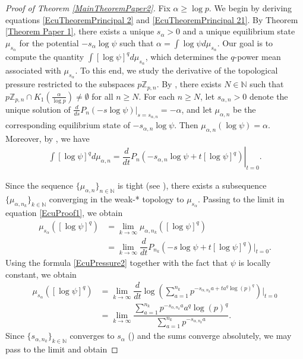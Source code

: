 \documentclass[11pt]{amsart}
\theoremstyle{remark}
\numberwithin{equation}{section}
\newcommand{\N}{\mathbb{N}}
\newcommand{\Z}{\mathbb{Z}}
\begin{document}
\begin{proof}[Proof of Theorem \ref{MainTheoremPaper2}]
    Fix $\alpha\geq \log p$. We begin by deriving equations \eqref{EcuTheoremPrincipal 2} and \eqref{EcuTheoremPrincipal 21}. By Theorem \ref{Theorem Paper 1}, there exists a unique $s_{\alpha}>0$ and a unique equilibrium state $\mu_{s_{\alpha}}$ for the potential $-s_{\alpha}\log\psi$ such that $\alpha=\int \log\psi d\mu_{s_{\alpha}}$. Our goal is to compute the quantity $\int [\log\psi]^{q}d\mu_{s_{\alpha}}$, which determines the $q$-power mean associated with $\mu_{s_{\alpha}}$. To this end, we study the derivative of the topological pressure restricted to the subspaces $p\Z_{p,n}$. By \cite[Theorem 3.3]{paper1}, there exists $N\in \N$ such that $p\Z_{p,n}\cap K_{1}(\frac{\alpha}{\log p})\neq \emptyset$ for all $n\geq N$. For each $n\geq N$, let $s_{\alpha,n}>0$ denote the unique solution of $\frac{d}{ds}P_{n}(-s\log\psi)\big\lvert_{s=s_{\alpha,n}}=-\alpha$, and let $\mu_{\alpha,n}$ be the corresponding equilibrium state of $-s_{\alpha,n}\log \psi$. Then $\mu_{\alpha,n}(\log\psi)=\alpha$. Moreover, by \cite[Theorem 5.6.5]{pu}, we have
    \begin{align}\label{EcuProof1}
        \int[\log\psi]^{q}d\mu_{\alpha,n}=\left.\dfrac{d}{dt}P_{n}(-s_{\alpha,n}\log\psi+t[\log\psi]^{q})\right|_{t=0}.
    \end{align}

    Since the sequence $\{\mu_{\alpha,n}\}_{n\in \N}$ is  tight (see \cite[page 10]{paper1}), there exists a subsequence $\{\mu_{\alpha,n_k}\}_{k\in \N}$ converging in the weak-* topology to $\mu_{s_\alpha}$. Passing to the limit in equation \eqref{EcuProof1}, we obtain 
    \begin{align*}
        \mu_{s_{\alpha}}([\log\psi]^{q})&=\lim_{k\to \infty}\mu_{\alpha,n_{k}}([\log\psi]^{q})\\
        & = \lim_{k\to \infty}\dfrac{d}{dt}P_{n_{k}}(-s\log\psi+t[\log\psi]^{q})\big\lvert_{t=0}.
    \end{align*}
    Using the formula \eqref{EcuPressure2} together with the fact that $\psi$ is locally constant, we obtain
    \begin{align*}
        \mu_{s_{\alpha}}([\log\psi]^{q})&=\lim_{k\to \infty}\dfrac{d}{dt}\log\left(\sum^{n_{k}}_{a=1}p^{-s_{\alpha,n_{k}}a+ta^{q}\log(p)^{q}}\right)\bigg\lvert_{t=0}\\
        &= \lim_{k\to \infty}\dfrac{\sum^{n_{k}}_{a=1}p^{-s_{\alpha,n_{k}}a}a^{q}\log(p)^{q}}{\sum^{n_{k}}_{a=1}p^{-s_{\alpha,n_{k}}a}}.
    \end{align*}
    Since $\{s_{\alpha,n_{k}}\}_{k\in \N}$ converges to $s_{\alpha}$ (\cite[p.10]{paper1}) and the sums converge absolutely, we may pass to the limit and obtain
    

\end{proof}
\end{document}
